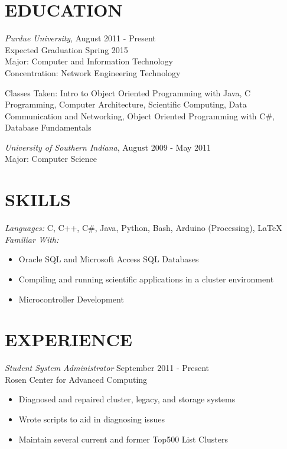\documentclass[line,margin]{res}
\begin{document}
\name{\textcolor{TealBlue}{Ethan Madden}}
\address{maddene@purdue.edu}
\address{(812) 250-1419}
 
\begin{resume}
\section{\textcolor{TealBlue}{EDUCATION}} 

				{\sl Purdue University}, \hfill August 2011 - Present \\
                Expected Graduation Spring 2015 \\
                Major: Computer and Information Technology \\
                Concentration: Network Engineering Technology
                
                Classes Taken: Intro to Object Oriented Programming with Java, C Programming, Computer Architecture, Scientific Computing, Data Communication and Networking, Object Oriented Programming with C\#, Database Fundamentals

        {\sl University of Southern Indiana}, \hfill August 2009 - May 2011 \\
                Major: Computer Science
                
 
\section{\textcolor{TealBlue}{SKILLS}} 
				{\sl Languages:}  C, C++, C\#, Java, Python, Bash, Arduino (Processing), \LaTeX \\
				{\sl Familiar With:} 
                \begin{itemize} \itemsep -2pt %
                  \item Oracle SQL and Microsoft Access SQL Databases
                  \item Compiling and running scientific applications in a cluster environment
                  \item Microcontroller Development
                \end{itemize}
 
\section{\textcolor{TealBlue}{EXPERIENCE}} 
				{\sl Student System Administrator} \hfill September 2011 - Present \\
                Rosen Center for Advanced Computing
                \begin{itemize}  \itemsep -2pt %
                  \item Diagnosed and repaired cluster, legacy, and storage systems
                  \item Wrote scripts to aid in diagnosing issues
                  \item Maintain several current and former Top500 List Clusters
                \end{itemize}


\end{resume}
\end{document}
